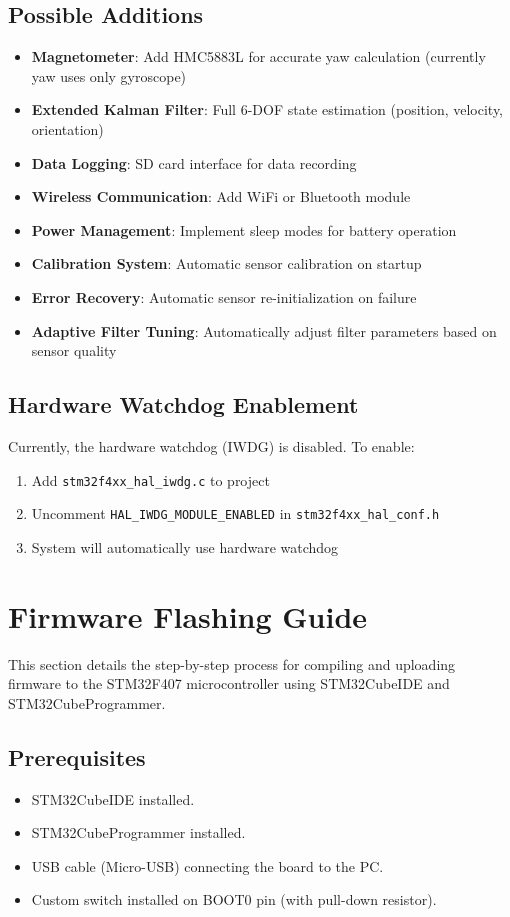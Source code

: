 \documentclass[11pt,a4paper]{article}
\begin{document}
\subsection{Possible Additions}
\begin{itemize}
    \item \textbf{Magnetometer}: Add HMC5883L for accurate yaw calculation (currently yaw uses only gyroscope)
    \item \textbf{Extended Kalman Filter}: Full 6-DOF state estimation (position, velocity, orientation)
    \item \textbf{Data Logging}: SD card interface for data recording
    \item \textbf{Wireless Communication}: Add WiFi or Bluetooth module
    \item \textbf{Power Management}: Implement sleep modes for battery operation
    \item \textbf{Calibration System}: Automatic sensor calibration on startup
    \item \textbf{Error Recovery}: Automatic sensor re-initialization on failure
    \item \textbf{Adaptive Filter Tuning}: Automatically adjust filter parameters based on sensor quality
\end{itemize}

\subsection{Hardware Watchdog Enablement}
Currently, the hardware watchdog (IWDG) is disabled. To enable:

\begin{enumerate}
    \item Add \texttt{stm32f4xx\_hal\_iwdg.c} to project
    \item Uncomment \texttt{HAL\_IWDG\_MODULE\_ENABLED} in \texttt{stm32f4xx\_hal\_conf.h}
    \item System will automatically use hardware watchdog
\end{enumerate}

\section{Firmware Flashing Guide}

This section details the step-by-step process for compiling and uploading firmware to the STM32F407 microcontroller using STM32CubeIDE and STM32CubeProgrammer.

\subsection{Prerequisites}
\begin{itemize}
    \item STM32CubeIDE installed.
    \item STM32CubeProgrammer installed.
    \item USB cable (Micro-USB) connecting the board to the PC.
    \item Custom switch installed on BOOT0 pin (with pull-down resistor).
\end{itemize}
\end{document}

